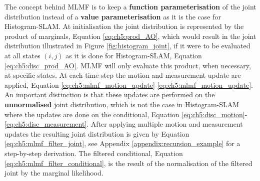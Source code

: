 The concept behind MLMF is to keep a  \textbf{function parameterisation} of the joint distribution instead of a \textbf{value parameterisation} as it is the case 
for Histogram-SLAM. At initialisation the joint distribution is represented by the product of marginals, Equation \ref{eq:ch5:prod_AO}, which 
would result in the joint distribution illustrated in Figure \ref{fig:histogram_joint}, if it were to be evaluated at all states $(i,j)$
as it is done for Histogram-SLAM, Equation \ref{eq:ch5:disc_prod_AO}. MLMF will only evaluate this product, when necessary, at specific states. 
At each time step the motion and measurement update are applied, Equation \ref{eq:ch5:mlmf_motion_update}-\ref{eq:ch5:mlmf_motion_update}.
An important distinction is that these updates are performed on the \textbf{unnormalised} joint distribution, which is not the case in Histogram-SLAM where 
the updates are done on the conditional, Equation \ref{eq:ch5:disc_motion}-\ref{eq:ch5:disc_measurement}. After applying multiple 
motion and measurement updates the resulting joint distribution is given by Equation \ref{eq:ch5:mlmf_filter_joint}, see Appendix \ref{appendix:recursion_example}
for a step-by-step derivation. The filtered conditional, Equation \ref{eq:ch5:mlmf_filter_conditional}, is the result of the normalisation of the 
filtered joint by the marginal likelihood.

 
